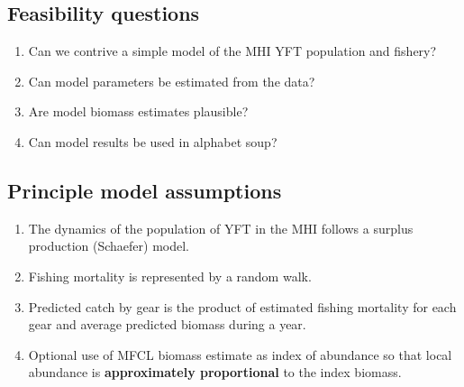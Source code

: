 \documentclass[letterpaper,KOMA,landscape,titlepage]{powersem}
\begin{document}
\begin{slide}\section{Feasibility questions}
\begin{enumerate}
\item Can we contrive a simple model of the MHI YFT population and
fishery?
\item Can model parameters be estimated from the data?
\item Are model biomass estimates plausible?
\item Can model results be used in alphabet soup?
\end{enumerate}
\end{slide}

\begin{slide}\section{Principle model assumptions}
\begin{enumerate}
\item The dynamics of the population of YFT in the MHI follows a
surplus production (Schaefer) model.
\item Fishing mortality is represented by a random walk.
\item Predicted catch by gear is the product of estimated fishing mortality
for each gear and average predicted biomass during a year.
\item Optional use of MFCL biomass estimate as index of abundance so
that local abundance is {\bfseries approximately proportional} to the
index biomass.
\end{enumerate}
\end{slide}
\end{document}
